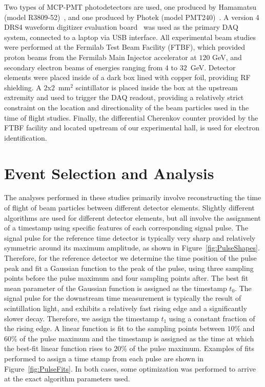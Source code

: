 \documentclass[12pt]{article}
\begin{document}
Two types of MCP-PMT photodetectors are used, one produced by Hamamatsu (model
R3809-52)~\cite{HamamatsuMCP3809}, and one produced by Photek (model
PMT240)~\cite{Photek240}. A version 4 DRS4 waveform digitizer evaluation
board~\cite{DRS4} was used as the primary DAQ system, connected to a laptop via
USB interface. All experimental beam studies were performed at the Fermilab Test
Beam Facility (FTBF), which provided proton beams from the Fermilab Main
Injector accelerator at $120$ GeV, and secondary electron beams of energies
ranging from $4$ to $32$~GeV. Detector elements were placed inside of a dark box
lined with copper foil, providing RF shielding. A $2$x$2$~$\mathrm{mm}^{2}$
scintillator is placed inside the box at the upstream extremity and used to
trigger the DAQ readout, providing a relatively strict constraint on the
location and directionality of the beam particles used in the time of flight
studies. Finally, the differential Cherenkov counter provided by the FTBF
facility and located upstream of our experimental hall, is used for electron
identification. 

\section{Event Selection and Analysis}

The analyses performed in these studies primarily involve reconstructing the
time of flight of beam particles between different detector elements. Slightly
different algorithms are used for different detector elements, but all involve
the assignment of a timestamp using specific features of each corresponding
signal pulse. The signal pulse for the reference time detector is typically very
sharp and relatively symmetric around its maximum amplitude, as shown in
Figure~\ref{fig:PulseShapes}. Therefore, for the reference detector we determine
the time position of the pulse peak and fit a Gaussian function to the peak of
the pulse, using three sampling points before the pulse maximum and four
sampling points after. The best fit mean parameter of the Gaussian function is
assigned as the timestamp $t_{0}$. The signal pulse for the downstream time
measurement is typically the result of scintillation light, and exhibits a
relatively fast rising edge and a significantly slower decay. Therefore, we
assign the timestamp $t_{1}$ using a constant fraction of the rising edge. A
linear function is fit to the sampling points between $10\%$ and $60\%$ of the
pulse maximum and the timestamp is assigned as the time at which the best-fit
linear function rises to $20\%$ of the pulse maximum. Examples of fits performed
to assign a time stamp from each pulse are shown in Figure~\ref{fig:PulseFits}.
In both cases, some optimization was performed to arrive at the exact algorithm
parameters used.
\end{document}
